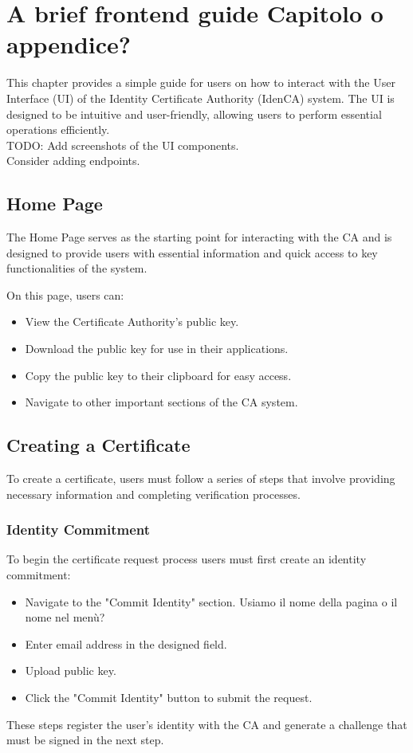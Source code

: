 \chapter{A brief frontend guide {\color{red}Capitolo o appendice?}}

This chapter provides a simple guide for users on how to interact with the User Interface (UI) of the Identity Certificate Authority (IdenCA) system. 
The UI is designed to be intuitive and user-friendly, allowing users to perform essential operations efficiently.
\\{\color{red}TODO: Add screenshots of the UI components.\\Consider adding endpoints.}

\section{Home Page}
The Home Page serves as the starting point for interacting with the CA and is designed to provide users with essential information and quick access to key functionalities of the system.

On this page, users can:
\begin{itemize}
    \item View the Certificate Authority's public key.
    \item Download the public key for use in their applications.
    \item Copy the public key to their clipboard for easy access.
    \item Navigate to other important sections of the CA system.
\end{itemize}

\section{Creating a Certificate}
To create a certificate, users must follow a series of steps that involve providing necessary information and completing verification processes. 
\subsection{Identity Commitment}
To begin the certificate request process users must first create an identity commitment:
\begin{itemize}
    \item Navigate to the "Commit Identity" section. {\color{red}Usiamo il nome della pagina o il nome nel menù?}
    \item Enter email address in the designed field.
    \item Upload public key.
    \item Click the "Commit Identity" button to submit the request.
\end{itemize}
These steps register the user's identity with the CA and generate a challenge that must be signed in the next step.

